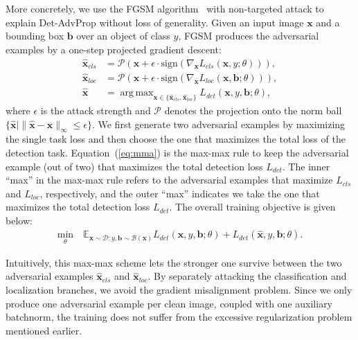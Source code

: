 \documentclass[final]{cvpr}
\DeclareMathOperator*{\argmax}{arg\,max}
\begin{document}
More concretely, we use the FGSM algorithm~\cite{goodfellow2015fgsm} with non-targeted attack to explain Det-AdvProp without loss of generality. Given an input image $\textbf{x}$ and a bounding box $\textbf{b}$ over an object of class $y$, FGSM produces the adversarial examples by a one-step projected gradient descent:
\begin{align}
\hat{\textbf{x}}_{cls} &= \mathcal{P}(\textbf{x}+\epsilon \cdot \text{sign}(\nabla_{\textbf{x}}L_{cls}(\textbf{x}, y; \theta))), \\
\hat{\textbf{x}}_{loc} &= \mathcal{P}(\textbf{x}+\epsilon \cdot \text{sign}(\nabla_{\textbf{x}}L_{loc}(\textbf{x}, \textbf{b}; \theta))), \\
\hat{\textbf{x}} &= \argmax_{\textbf{x}\in \{\hat{\textbf{x}}_{cls}, \hat{\textbf{x}}_{loc}\}}L_{det}(\textbf{x},y,\textbf{b};\theta),
\label{eq:mma}
\end{align}
where $\epsilon$ is the attack strength and $\mathcal{P}$ denotes the projection onto the norm ball $\{\hat{\textbf{x}}\mid\|\hat{\textbf{x}}-\textbf{x}\|_\infty \leq \epsilon\}$.
We first generate two adversarial examples by maximizing the single task loss and then choose the one that maximizes the total loss of the detection task. Equation~(\ref{eq:mma}) is the max-max rule to keep the adversarial example (out of two) that maximizes the total detection loss $L_{det}$. The inner ``max'' in the max-max rule refers to the adversarial examples that maximize $L_{cls}$ and $L_{loc}$, respectively, and the outer ``max'' indicates we take the one that maximizes the total detection loss $L_{det}$.
The overall training objective is given below:
\begin{align}
    \min_\theta\ & \mathbb{E}_{\textbf{x}\sim\mathcal{D}; y,\textbf{b}\sim\mathcal{B}(\textbf{x})} L_{det}(\textbf{x},y,\textbf{b};\theta) + L_{det}(\hat{\textbf{x}},y,\textbf{b};\theta).
\end{align}



Intuitively, this max-max scheme lets the stronger one survive between the two  adversarial examples $\hat{\textbf{x}}_{cls}$ and $\hat{\textbf{x}}_{loc}$.  By separately attacking the classification and localization branches, we avoid the gradient misalignment problem.
Since we only produce one adversarial example per clean image, coupled with one auxiliary batchnorm, the training does not suffer from the excessive regularization problem mentioned earlier.
\end{document}
